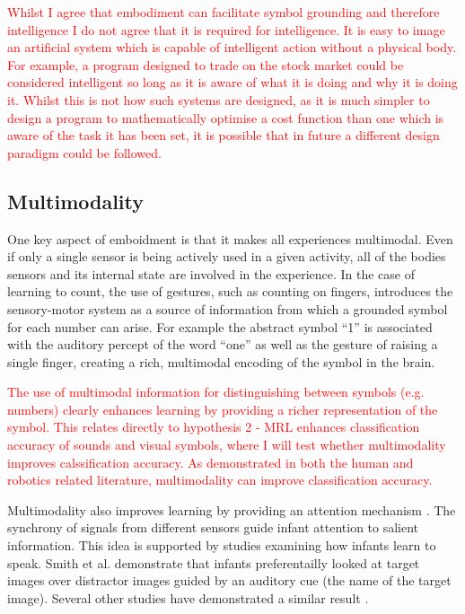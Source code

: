 \textcolor{red}{Whilst I agree that embodiment can facilitate symbol grounding and therefore intelligence I do not agree that it is required for intelligence. It is easy to image an artificial system which is capable of intelligent action without a physical body. For example, a program designed to trade on the stock market could be considered intelligent so long as it is aware of what it is doing and why it is doing it. Whilst this is not how such systems are designed, as it is much simpler to design a program to mathematically optimise a cost function than one which is aware of the task it has been set, it is possible that in future a different design paradigm could be followed.}

\subsection{Multimodality}
One key aspect of emboidment is that it makes all experiences multimodal. Even if only a single sensor is being actively used in a given activity, all of the bodies sensors and its internal state are involved in the experience. 
In the case of learning to count, the use of gestures, such as counting on fingers, introduces the sensory-motor system as a source of information from which a grounded symbol for each number can arise. For example the abstract symbol ``1'' is associated with the auditory percept of the word ``one'' as well as the gesture of raising a single finger, creating a rich, multimodal encoding of the symbol in the brain.

\textcolor{red}{The use of multimodal information for distinguishing between symbols (e.g. numbers) clearly enhances learning by providing a richer representation of the symbol. This relates directly to hypothesis 2 - \ac{MRL} enhances classification accuracy of sounds and visual symbols, where I will test whether multimodality improves calssification accuracy. As demonstrated in both the human and robotics related literature, multimodality can improve classification accuracy.} 

Multimodality also improves learning by providing an attention mechanism \cite{bahrick2000intersensory}. The synchrony of signals from different sensors guide infant attention to salient information. This idea is supported by studies examining how infants learn to speak.  Smith et al. \cite{smith2008infants} demonstrate that infants preferentailly looked at target images over distractor images guided by an auditory cue (the name of the target image). Several other studies have demonstrated a similar result \cite{walker2010preverbal, fischer2011multi, scott20122, slater1999intermodal}.

